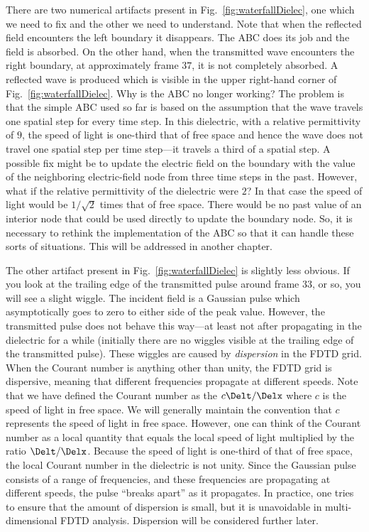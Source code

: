 There are two numerical artifacts present in Fig.\
\ref{fig:waterfallDielec}, one which we need to fix and the other we
need to understand.  Note that when the reflected field encounters the
left boundary it disappears.  The ABC does its job and the field is
absorbed.  On the other hand, when the transmitted wave encounters the
right boundary, at approximately frame $37$, it is not completely
absorbed.  A reflected wave is produced which is visible in the upper
right-hand corner of Fig.\ \ref{fig:waterfallDielec}.  Why is the ABC
no longer working?  The problem is that the simple ABC used so far is
based on the assumption that the wave travels one spatial step for
every time step.  In this dielectric, with a relative permittivity of
$9$, the speed of light is one-third that of free space and hence the
wave does not travel one spatial step per time step---it travels a
third of a spatial step.  A possible fix might be to update the
electric field on the boundary with the value of the neighboring
electric-field node from three time steps in the past.  However, what
if the relative permittivity of the dielectric were $2$?  In that case
the speed of light would be $1/\sqrt{2}$ times that of free space.
There would be no past value of an interior node that could be used
directly to update the boundary node.  So, it is necessary to rethink
the implementation of the ABC so that it can handle these sorts of
situations.  This will be addressed in another chapter.

The other artifact present in Fig.\ \ref{fig:waterfallDielec} is
slightly less obvious.  If you look at the trailing edge of the
transmitted pulse around frame $33$, or so, you will see a slight
wiggle.  The incident field is a Gaussian pulse which asymptotically
goes to zero to either side of the peak value.  However, the
transmitted pulse does not behave this way---at least not after
propagating in the dielectric for a while (initially there are no
wiggles visible at the trailing edge of the transmitted pulse).  These
wiggles are caused by {\em dispersion}
in the FDTD grid.  When the Courant number is anything other than
unity, the FDTD grid is dispersive, meaning that different frequencies
propagate at different speeds.  Note that we have defined the Courant
number as the $c\Delt/\Delx$ where $c$ is the speed of light in free
space.  We will generally maintain the convention that $c$ represents
the speed of light in free space.  However, one can think of the
Courant number as a local quantity that equals the local speed of
light multiplied by the ratio $\Delt/\Delx$.
Because the speed of light is one-third of that of free space, the
local Courant number in the dielectric is not unity.  Since the
Gaussian pulse consists of a range of frequencies, and these
frequencies are propagating at different speeds, the pulse ``breaks
apart'' as it propagates.  In practice, one tries to ensure that the
amount of dispersion is small, but it is unavoidable in
multi-dimensional FDTD analysis.  Dispersion will be considered
further later.

